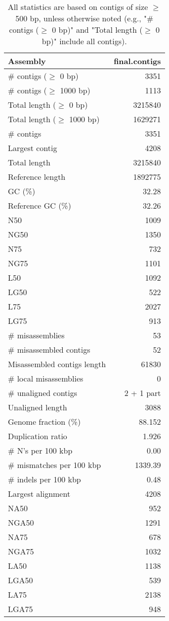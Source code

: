 \documentclass[12pt,a4paper]{article}
\begin{document}
\begin{table}[ht]
\begin{center}
\caption{All statistics are based on contigs of size $\geq$ 500 bp, unless otherwise noted (e.g., "\# contigs ($\geq$ 0 bp)" and "Total length ($\geq$ 0 bp)" include all contigs).}
\begin{tabular}{|l*{1}{|r}|}
\hline
Assembly & final.contigs \\ \hline
\# contigs ($\geq$ 0 bp) & 3351 \\ \hline
\# contigs ($\geq$ 1000 bp) & 1113 \\ \hline
Total length ($\geq$ 0 bp) & 3215840 \\ \hline
Total length ($\geq$ 1000 bp) & 1629271 \\ \hline
\# contigs & 3351 \\ \hline
Largest contig & 4208 \\ \hline
Total length & 3215840 \\ \hline
Reference length & 1892775 \\ \hline
GC (\%) & 32.28 \\ \hline
Reference GC (\%) & 32.26 \\ \hline
N50 & 1009 \\ \hline
NG50 & 1350 \\ \hline
N75 & 732 \\ \hline
NG75 & 1101 \\ \hline
L50 & 1092 \\ \hline
LG50 & 522 \\ \hline
L75 & 2027 \\ \hline
LG75 & 913 \\ \hline
\# misassemblies & 53 \\ \hline
\# misassembled contigs & 52 \\ \hline
Misassembled contigs length & 61830 \\ \hline
\# local misassemblies & 0 \\ \hline
\# unaligned contigs & 2 + 1 part \\ \hline
Unaligned length & 3088 \\ \hline
Genome fraction (\%) & 88.152 \\ \hline
Duplication ratio & 1.926 \\ \hline
\# N's per 100 kbp & 0.00 \\ \hline
\# mismatches per 100 kbp & 1339.39 \\ \hline
\# indels per 100 kbp & 0.48 \\ \hline
Largest alignment & 4208 \\ \hline
NA50 & 952 \\ \hline
NGA50 & 1291 \\ \hline
NA75 & 678 \\ \hline
NGA75 & 1032 \\ \hline
LA50 & 1138 \\ \hline
LGA50 & 539 \\ \hline
LA75 & 2138 \\ \hline
LGA75 & 948 \\ \hline
\end{tabular}
\end{center}
\end{table}
\end{document}
